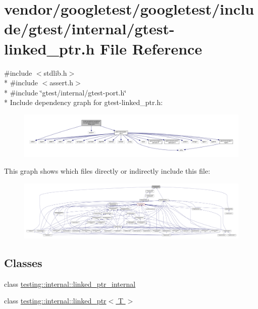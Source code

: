 \hypertarget{gtest-linked__ptr_8h}{}\section{vendor/googletest/googletest/include/gtest/internal/gtest-\/linked\+\_\+ptr.h File Reference}
\label{gtest-linked__ptr_8h}
{\ttfamily \#include $<$stdlib.\+h$>$}\\*
{\ttfamily \#include $<$assert.\+h$>$}\\*
{\ttfamily \#include \char`\"{}gtest/internal/gtest-\/port.\+h\char`\"{}}\\*
Include dependency graph for gtest-\/linked\+\_\+ptr.h\+:\nopagebreak
\begin{figure}[H]
\begin{center}
\leavevmode
\includegraphics[width=350pt]{gtest-linked__ptr_8h__incl}
\end{center}
\end{figure}
This graph shows which files directly or indirectly include this file\+:\nopagebreak
\begin{figure}[H]
\begin{center}
\leavevmode
\includegraphics[width=350pt]{gtest-linked__ptr_8h__dep__incl}
\end{center}
\end{figure}
\subsection*{Classes}
\begin{DoxyCompactItemize}
\item 
class \hyperlink{classtesting_1_1internal_1_1linked__ptr__internal}{testing\+::internal\+::linked\+\_\+ptr\+\_\+internal}
\item 
class \hyperlink{classtesting_1_1internal_1_1linked__ptr}{testing\+::internal\+::linked\+\_\+ptr$<$ T $>$}
\end{DoxyCompactItemize}
